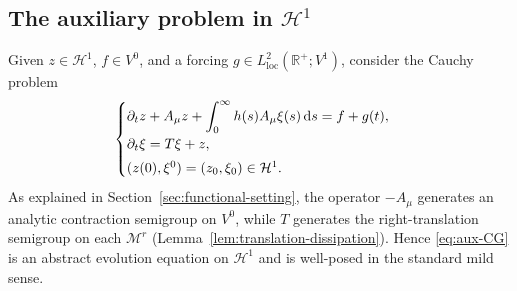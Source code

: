 \documentclass[12pt,leqno]{amsart}
\def\d{{\rm d}}
\def\pt {{\partial_t}}
\theoremstyle{definition}
\numberwithin{equation}{section}
\numberwithin{figure}{section}
\begin{document}
\subsection{The auxiliary problem in $\mathcal H^{1}$}\label{subsec:aux-problem}

Given $z\in\mathcal H^{1}$, $f\in {V^0}$, and a forcing
$g\in L^{2}_{\mathrm{loc}}(\mathbb R^{+};{V^1})$,   consider the Cauchy problem
\begin{equation}\label{eq:aux-CG}
\begin{cases}
\pt z + A_{\mu}z + \displaystyle\int_{0}^{\infty}h(s)A_{\mu}\xi(s)\,\d s = f+g(t),\\[2mm]
\pt \xi = T\xi + z,\\[1mm]
(z(0),\xi^{0})=(z_{0},\xi_{0})\in\mathcal H^{1}.
\end{cases}
\end{equation}
As explained in Section~\ref{sec:functional-setting}, the operator $-A_{\mu}$ generates an analytic
contraction semigroup on ${V^0}$, while $T$ generates the right-translation semigroup on each
${\mathcal M^{r}}$ (Lemma~\ref{lem:translation-dissipation}). Hence \eqref{eq:aux-CG} is an abstract
evolution equation on $\mathcal H^{1}$ and is well-posed in the standard mild sense.







\end{document}
